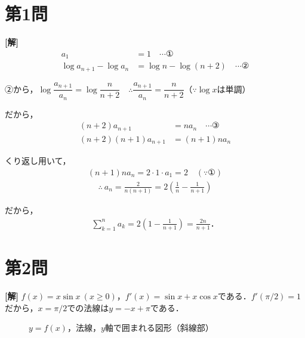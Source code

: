 \documentclass[../main.tex]{subfiles}
\begin{document}
\section*{第1問}

{\bf [解]}
\begin{align*}
  a_1&=1\quad\cdots①\\
  \log a_{n+1}-\log a_n&=\log n-\log(n+2)\quad\cdots②
\end{align*}

②から，$\log\dfrac{a_{n+1}}{a_n}=\log\dfrac n{n+2}\quad\therefore\dfrac{a_{n+1}}{a_n}=\dfrac n{n+2}$（$\because\log x$は単調）

だから，
\begin{align*}
  (n+2)a_{n+1}&=na_n\quad\cdots③\\
  (n+2)(n+1)a_{n+1}&=(n+1)na_n
\end{align*}

くり返し用いて，
\begin{align*}
  (n+1)na_n=2\cdot1\cdot a_1=2\quad(\because①)
\end{align*}
\begin{align*}
  \therefore\ a_n=\frac2{n(n+1)}=2\left(\frac1n-\frac1{n+1}\right)
\end{align*}

だから，
\begin{align*}
  \sum_{k=1}^na_k=2\left(1-\frac1{n+1}\right)=\frac{2n}{n+1}．
\end{align*}

\newpage

\section*{第2問}

{\bf [解]}
$f(x)=x\sin x\ (x\ge0)$，$f'(x)=\sin x+x\cos x$である．$f'(\pi/2)=1$だから，$x=\pi/2$での法線は$y=-x+\pi$である．

\begin{figure}[htb]
  \centering
  \caption{$y=f(x)$，法線，$y$軸で囲まれる図形（斜線部）}
\end{figure}
\end{document}
